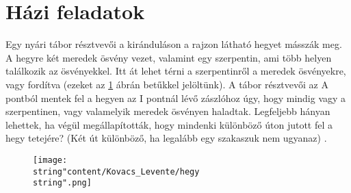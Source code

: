 \section*{Házi feladatok}
\begin{problem}
Egy nyári tábor résztvevői a kiránduláson a rajzon látható hegyet
másszák meg. A hegyre két meredek ösvény vezet, valamint egy szerpentin,
ami több helyen találkozik az ösvényekkel. Itt át lehet térni a szerpentinről
a meredek ösvényekre, vagy fordítva (ezeket az \ref{fig2} ábrán betűkkel
jelöltünk). A tábor résztvevői az A pontból mentek fel a hegyen az
I pontnál lévő zászlóhoz úgy, hogy mindig vagy a szerpentinen, vagy
valamelyik meredek ösvényen haladtak. Legfeljebb hányan lehettek,
ha végül megállapították, hogy mindenki különböző úton jutott fel
a hegy tetejére? (Két út különböző, ha legalább egy szakaszuk nem
ugyanaz) \cite{Moz2}.
\end{problem}
\begin{figure}
\centering \texttt{[image: \\string"content/Kovacs\_Levente/hegy\\string".png]}
\caption{}
\label{fig2} 
\end{figure}

